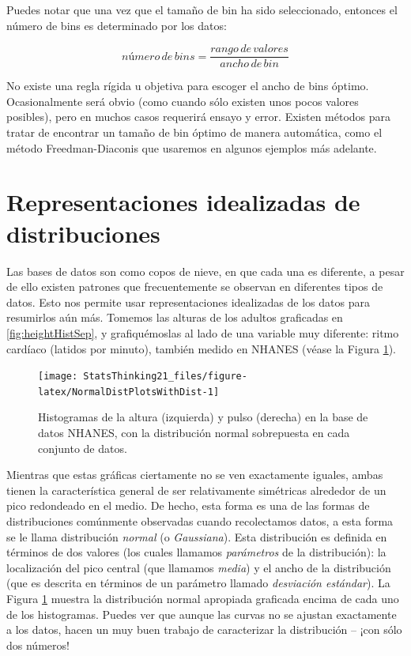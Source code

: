\documentclass[
  12pt,
]{book}
\theoremstyle{definition}
\theoremstyle{definition}
\theoremstyle{definition}
\theoremstyle{remark}
\begin{document}
Puedes notar que una vez que el tamaño de bin ha sido seleccionado, entonces el número de bins es determinado por los datos:

\[
número\, de\, bins  = \frac{rango\, de\, valores}{ancho\, de\, bin}
\]

No existe una regla rígida u objetiva para escoger el ancho de bins óptimo. Ocasionalmente será obvio (como cuando sólo existen unos pocos valores posibles), pero en muchos casos requerirá ensayo y error. Existen métodos para tratar de encontrar un tamaño de bin óptimo de manera automática, como el método Freedman-Diaconis que usaremos en algunos ejemplos más adelante.

\hypertarget{representaciones-idealizadas-de-distribuciones}{%
\section{Representaciones idealizadas de distribuciones}\label{representaciones-idealizadas-de-distribuciones}}

Las bases de datos son como copos de nieve, en que cada una es diferente, a pesar de ello existen patrones que frecuentemente se observan en diferentes tipos de datos. Esto nos permite usar representaciones idealizadas de los datos para resumirlos aún más. Tomemos las alturas de los adultos graficadas en \ref{fig:heightHistSep}, y grafiquémoslas al lado de una variable muy diferente: ritmo cardíaco (latidos por minuto), también medido en NHANES (véase la Figura \ref{fig:NormalDistPlotsWithDist}).

\begin{figure}
\texttt{[image: StatsThinking21\_files/figure-latex/NormalDistPlotsWithDist-1]} \caption{Histogramas de la altura (izquierda) y pulso (derecha) en la base de datos NHANES, con la distribución normal sobrepuesta en cada conjunto de datos.}\label{fig:NormalDistPlotsWithDist}
\end{figure}

Mientras que estas gráficas ciertamente no se ven exactamente iguales, ambas tienen la característica general de ser relativamente simétricas alrededor de un pico redondeado en el medio. De hecho, esta forma es una de las formas de distribuciones comúnmente observadas cuando recolectamos datos, a esta forma se le llama distribución \emph{normal} (o \emph{Gaussiana}). Esta distribución es definida en términos de dos valores (los cuales llamamos \emph{parámetros} de la distribución): la localización del pico central (que llamamos \emph{media}) y el ancho de la distribución (que es descrita en términos de un parámetro llamado \emph{desviación estándar}). La Figura \ref{fig:NormalDistPlotsWithDist} muestra la distribución normal apropiada graficada encima de cada uno de los histogramas. Puedes ver que aunque las curvas no se ajustan exactamente a los datos, hacen un muy buen trabajo de caracterizar la distribución -- ¡con sólo dos números!
\end{document}
